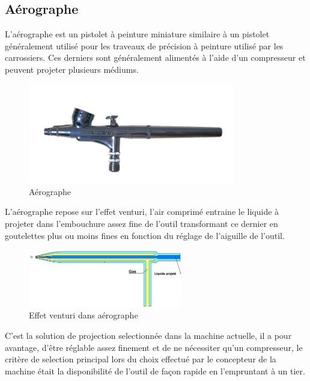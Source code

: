 \newpage
\subsection{Aérographe} \label{section_aerographe}
L'aérographe est un pistolet à peinture miniature similaire à un pistolet généralement utilisé pour les traveaux de précision
à peinture utilisé par les carrossiers.
Ces derniers sont généralement alimentés à l'aide d'un compresseur et peuvent projeter plusieurs médiums.

\begin{figure}[H]
    \centering
    \includegraphics[width=0.8\textwidth]{assets/figures/etat_art/airbrush.png}
    \caption[Aérographe]{Aérographe \cite{airbrush_pics}\footnotemark}
\end{figure}

L'aérographe repose sur l'effet venturi, l'air comprimé entraine le liquide à projeter dans l'embouchure assez fine de l'outil
transformant ce dernier en goutelettes plus ou moins fines en fonction du réglage de l'aiguille de l'outil.

\begin{figure}[H]
    \centering
    \includegraphics[width=0.6\textwidth]{assets/figures/etat_art/effet_venturi_aerographe.jpg}
    \caption[Effet venturi dans aérographe]{Effet venturi dans aérographe \cite{venturi_airbrush}\footnotemark}
\end{figure}

C'est la solution de projection selectionnée dans la machine actuelle, il a pour avantage, d'être réglable assez finement
et de ne nécessiter qu'un compresseur, le critère de selection principal lors du choix effectué par le concepteur de la machine
était la disponibilité de l'outil de façon rapide en l'empruntant à un tier.

